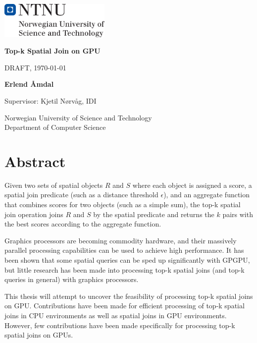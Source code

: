 \documentclass[12pt]{report}
\begin{document}
\begin{titlepage}
    \sffamily
    \setlength{\parindent}{0pt}
    \includegraphics[width=0.4\textwidth]{ntnu}

    \vspace*{2cm}

    \Huge
    \textbf{Top-k Spatial Join on GPU}

    \vspace{0.5cm}
    \LARGE
    DRAFT, \today

    \vspace{1.5cm}

    \textbf{Erlend Åmdal}

    \vfill

    \large
    Supervisor: Kjetil Nørvåg, IDI

    \vspace{1.5cm}
    Norwegian University of Science and Technology\\
    Department of Computer Science
\end{titlepage}

\chapter*{Abstract}
Given two sets of spatial objects \(R\) and \(S\) where each object is assigned a score, a spatial join predicate (such as a distance threshold \(\epsilon\)), and an aggregate function that combines scores for two objects (such as a simple sum), the top-k spatial join operation joins \(R\) and \(S\) by the spatial predicate and returns the \(k\) pairs with the best scores according to the aggregate function. %

Graphics processors are becoming commodity hardware, and their massively parallel processing capabilities can be used to achieve high performance. It has been shown that some spatial queries can be sped up significantly with GPGPU, but little research has been made into processing top-k spatial joins (and top-k queries in general) with graphics processors.

This thesis will attempt to uncover the feasibility of processing top-k spatial joins on GPU\@. Contributions have been made for efficient processing of top-k spatial joins in CPU environments as well as spatial joins in GPU environments. However, few contributions have been made specifically for processing top-k spatial joins on GPUs.
\end{document}
